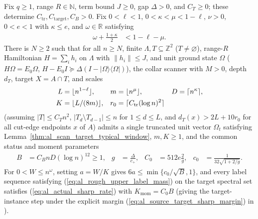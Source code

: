 \begin{lemma}
    \label{thm:al_source_target_actual_sharp_upper}
    \leanok
    Fix $q\geq1$, range $R\in\mathbb N$, term bound $J\geq0$, gap $\Delta>0$,
    and $C_T\geq0$; these determine $C_{\mathrm{tr}},C_{\mathrm{target}},C_B>0$.
    Fix $0<\ell<1$, $0<\kappa<\mu<1-\ell$, $\nu>0$, $0<e<1$ with $\kappa\leq e$,
    and $\omega\in\mathbb R$ satisfying
    \begin{align}
        \omega+\frac{1+\kappa}{2} & <1-\ell-\mu.
        \label{eq:al_source_target_sharp_margin}
    \end{align}
    There is $N\geq2$ such that for all $n\geq N$, finite
    $\Lambda,T\subseteq\mathbb Z^2$ ($T\ne\varnothing$), range-$R$ Hamiltonian
    $H=\sum_i h_i$ on $\Lambda$ with $\|h_i\|\leq J$, and unit ground state
    $\Omega$ ($H\Omega=E_0\Omega$,
    $H-E_0I\succeq\Delta(I-|\Omega\rangle\langle\Omega|)$), the collar scanner
    with $M>0$, depth $d_T$, target $X=A\cap T$, and scales
    \begin{align}
        L   & =\lfloor n^{1-\ell}\rfloor,                       &
        m   & =\lfloor n^\mu\rfloor,                            &
        D   & =\lceil n^\kappa\rceil,                    \notag   \\
        K   & =\lfloor L/(8m)\rfloor,                           &
        r_0 & =\lceil C_{\mathrm{tr}}(\log n)^2\rceil \notag
    \end{align}
    (assuming $|T|\leq C_Tn^2$, $|T_d\setminus T_{d-1}|\leq n$ for
    $1\leq d\leq L$, and $d_T(x)>2L+10r_0$ for all cut-edge endpoints $x$ of
    $A$) admits a single truncated unit vector $\Omega_t$ satisfying
    Lemma~\ref{thm:al_scan_target_typical_window}, $m,K\geq1$, and the common
    status and moment parameters
    \begin{align}
        B   & =C_B nD(\log n)^{12}\geq1, &
        g   & =\frac{\Delta}{c_+},       &
        C_0 & =512e\frac2g,              &
        c_0 & =\frac{1}{32\sqrt{1+2/g}}.
        \label{eq:al_source_target_sharp_budget}
    \end{align}
    For $0<W\leq n^\omega$, setting $a=W/K$ gives $6a\leq\min\{c_0/\sqrt B,1\}$,
    and every label sequence satisfying (\ref{eq:al_rough_upper_label_mass}) on
    the target spectral set satisfies (\ref{eq:al_actual_sharp_rate}) with
    $K_{\mathrm{mom}}=C_0B$ (giving the target-instance step under the explicit
    margin (\ref{eq:al_source_target_sharp_margin}) in
    \cite[Proposition~9.6]{OpenAI2026AreaLaw}).
\end{lemma}
